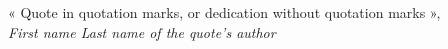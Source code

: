 \thispagestyle{empty}
\vspace*{\fill}
\begin{flushright}
« Quote in quotation marks, or dedication without quotation marks »,\\[1ex]
{\textit{First name Last name of the quote's author}}
\end{flushright}
\vspace*{\fill}
\newpage
